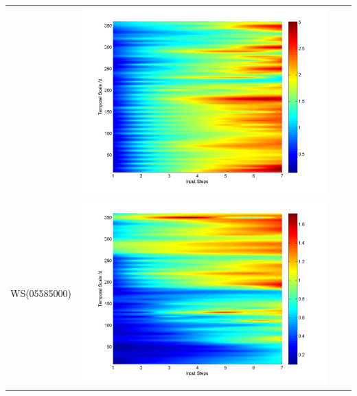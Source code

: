 \documentclass[11pt]{article}
\begin{document}
\begin{table}[H]
{\begin{tabular}{cccc}
&\begin{minipage}{.3\textwidth}\includegraphics[width=\linewidth]{resultgraph/02143000pepq.png}\end{minipage}
\\
WS(05585000)
&\begin{minipage}{.3\textwidth}\includegraphics[width=\linewidth]{resultgraph/05585000p.png}\end{minipage}

\end{tabular}}
\end{table}
\end{document}
